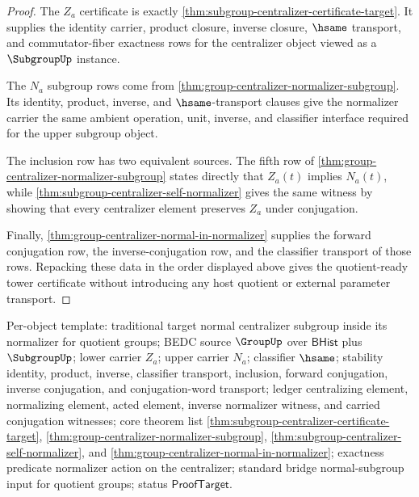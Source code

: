 \begin{proof}
The $Z_a$ certificate is exactly
\autoref{thm:subgroup-centralizer-certificate-target}. It supplies the
identity carrier, product closure, inverse closure, $\hsame$ transport, and
commutator-fiber exactness rows for the centralizer object viewed as a
$\SubgroupUp$ instance.

The $N_a$ subgroup rows come from
\autoref{thm:group-centralizer-normalizer-subgroup}. Its identity, product,
inverse, and $\hsame$-transport clauses give the normalizer carrier the same
ambient operation, unit, inverse, and classifier interface required for the
upper subgroup object.

The inclusion row has two equivalent sources. The fifth row of
\autoref{thm:group-centralizer-normalizer-subgroup} states directly that
$Z_a(t)$ implies $N_a(t)$, while
\autoref{thm:subgroup-centralizer-self-normalizer} gives the same witness by
showing that every centralizer element preserves $Z_a$ under conjugation.

Finally,
\autoref{thm:group-centralizer-normal-in-normalizer} supplies the forward
conjugation row, the inverse-conjugation row, and the classifier transport of
those rows. Repacking these data in the order displayed above gives the
quotient-ready tower certificate without introducing any host quotient or
external parameter transport.
\end{proof}

Per-object template: traditional target normal centralizer subgroup inside
its normalizer for quotient groups; BEDC source $\GroupUp$ over
$\mathsf{BHist}$ plus $\SubgroupUp$; lower carrier $Z_a$; upper carrier
$N_a$; classifier $\hsame$; stability identity, product, inverse, classifier
transport, inclusion, forward conjugation, inverse conjugation, and
conjugation-word transport; ledger centralizing element, normalizing element,
acted element, inverse normalizer witness, and carried conjugation witnesses;
core theorem list \autoref{thm:subgroup-centralizer-certificate-target},
\autoref{thm:group-centralizer-normalizer-subgroup},
\autoref{thm:subgroup-centralizer-self-normalizer}, and
\autoref{thm:group-centralizer-normal-in-normalizer}; exactness predicate
normalizer action on the centralizer; standard bridge normal-subgroup input
for quotient groups; status $\mathsf{ProofTarget}$.


